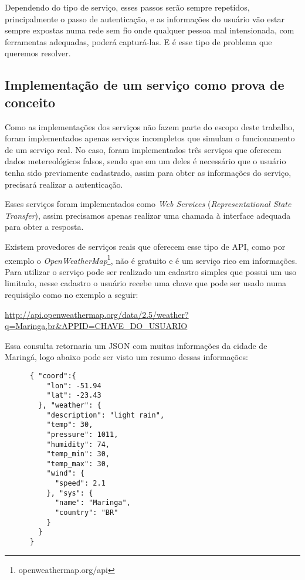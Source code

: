 Dependendo do tipo de serviço, esses passos serão sempre repetidos, principalmente o passo de autenticação, e as informações do usuário vão estar sempre expostas numa rede sem fio onde qualquer pessoa mal intensionada, com ferramentas adequadas, poderá capturá-las. E é esse tipo de problema que queremos resolver.

\subsection{Implementação de um serviço como prova de conceito}
Como as implementações dos serviços não fazem parte do escopo deste trabalho, foram implementados apenas serviços incompletos que simulam o funcionamento de um serviço real. No caso, foram implementados três serviços que oferecem dados metereológicos falsos, sendo que em um deles é necessário que o usuário tenha sido previamente cadastrado, assim para obter as informações do serviço, precisará realizar a autenticação.

Esses serviços foram implementados como \textit{Web Services}  (\textit{Representational State Transfer}), assim precisamos apenas realizar uma chamada à interface adequada para obter a resposta.

Existem provedores de serviços reais que oferecem esse tipo de API, como por exemplo o \textit{OpenWeatherMap}\footnote{openweathermap.org/api}, não é gratuito e é um serviço rico em informações. Para utilizar o serviço pode ser realizado um cadastro simples que possui um uso limitado, nesse cadastro o usuário recebe uma chave que pode ser usado numa requisição como no exemplo a seguir:

\url{http://api.openweathermap.org/data/2.5/weather?q=Maringa,br&APPID=CHAVE_DO_USUARIO}

Essa consulta retornaria um JSON com muitas informações da cidade de Maringá, logo abaixo pode ser visto um resumo dessas informações:

\begin{footnotesize}
  \begin{verbatim}
      { "coord":{
          "lon": -51.94
          "lat": -23.43
        }, "weather": {
          "description": "light rain",
          "temp": 30,
          "pressure": 1011,
          "humidity": 74,
          "temp_min": 30,
          "temp_max": 30,
          "wind": {
            "speed": 2.1
          }, "sys": {
            "name": "Maringa",
            "country": "BR"
          }
        }
      }
  \end{verbatim}
\end{footnotesize}

